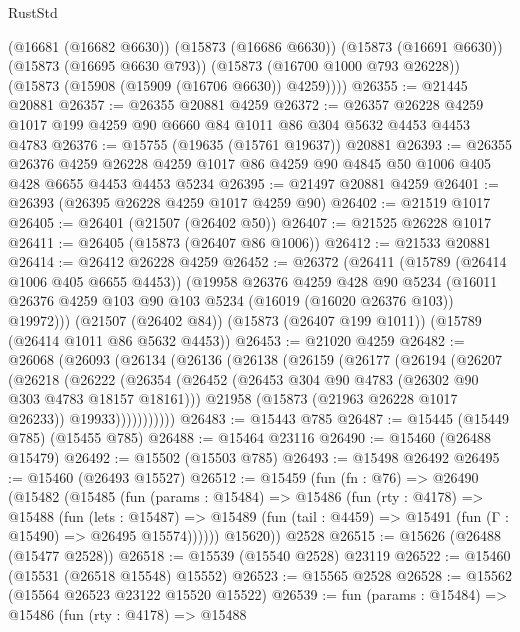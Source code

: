 \begin{lexlean}{RustStd}
\begin{coremodule}
        (@16681 (@16682 @6630))
        (@15873 (@16686 @6630))
        (@15873 (@16691 @6630))
        (@15873 (@16695 @6630 @793))
        (@15873 (@16700 @1000 @793 @26228))
        (@15873 (@15908 (@15909 (@16706 @6630)) @4259))))
@26355 := @21445 @20881
@26357 := @26355 @20881 @4259
@26372 := @26357 @26228 @4259 @1017 @199 @4259 @90 @6660 @84 @1011 @86 @304 @5632 @4453 @4453 @4783
@26376 := @15755 (@19635 (@15761 @19637)) @20881
@26393 := @26355
    @26376
    @4259
    @26228
    @4259
    @1017
    @86
    @4259
    @90
    @4845
    @50
    @1006
    @405
    @428
    @6655
    @4453
    @4453
    @5234
@26395 := @21497 @20881 @4259
@26401 := @26393 (@26395 @26228 @4259 @1017 @4259 @90)
@26402 := @21519 @1017
@26405 := @26401 (@21507 (@26402 @50))
@26407 := @21525 @26228 @1017
@26411 := @26405 (@15873 (@26407 @86 @1006))
@26412 := @21533 @20881
@26414 := @26412 @26228 @4259
@26452 := @26372
    (@26411
      (@15789 (@26414 @1006 @405 @6655 @4453))
      (@19958
        @26376
        @4259
        @428
        @90
        @5234
        (@16011 @26376 @4259 @103 @90 @103 @5234 (@16019 (@16020 @26376 @103)) @19972)))
    (@21507 (@26402 @84))
    (@15873 (@26407 @199 @1011))
    (@15789 (@26414 @1011 @86 @5632 @4453))
@26453 := @21020 @4259
@26482 := @26068
    (@26093
      (@26134
        (@26136
          (@26138
            (@26159
              (@26177
                (@26194
                  (@26207
                    (@26218
                      (@26222
                        (@26354
                          (@26452 (@26453 @304 @90 @4783 (@26302 @90 @303 @4783 @18157 @18161)))
                          @21958
                          (@15873 (@21963 @26228 @1017 @26233))
                          @19933)))))))))))
@26483 := @15443 @785
@26487 := @15445 (@15449 @785) (@15455 @785)
@26488 := @15464 @23116
@26490 := @15460 (@26488 @15479)
@26492 := @15502 (@15503 @785)
@26493 := @15498 @26492
@26495 := @15460 (@26493 @15527)
@26512 := @15459
    (fun (fn : @76) =>
    @26490
      (@15482
        (@15485
          (fun (params : @15484) =>
          @15486
            (fun (rty : @4178) =>
            @15488
              (fun (lets : @15487) =>
              @15489 (fun (tail : @4459) => @15491 (fun (Γ : @15490) => @26495 @15574))))))
        @15620))
    @2528
@26515 := @15626 (@26488 (@15477 @2528))
@26518 := @15539 (@15540 @2528) @23119
@26522 := @15460 (@15531 (@26518 @15548) @15552)
@26523 := @15565 @2528
@26528 := @15562 (@15564 @26523 @23122 @15520 @15522)
@26539 := fun (params : @15484) =>
  @15486
    (fun (rty : @4178) =>
    @15488

\end{coremodule}
\end{lexlean}
